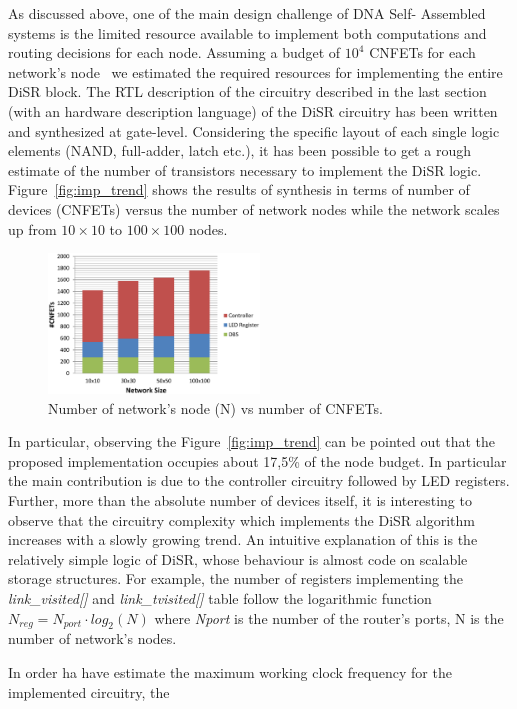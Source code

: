 As discussed above, one of the main design challenge of DNA Self-
Assembled systems is the limited resource available to implement both
computations and routing decisions for each node. Assuming a budget of
$10^4$ CNFETs for each network's node~\cite{liu_jetcs}  we estimated
the required resources for implementing the entire DiSR block. The RTL
description of the circuitry described in the last section (with an
hardware description language)  of the DiSR circuitry has been written
and synthesized at gate-level. Considering the specific layout of each
single logic elements (NAND, full-adder, latch etc.), it has been
possible to get a rough estimate of the number of transistors
necessary to implement the DiSR logic. Figure~\ref{fig:imp_trend}
shows the results of synthesis in terms of number of devices (CNFETs)
versus the number of network nodes while the network scales up from
$10\times10$ to $100\times100$ nodes.

\begin{figure}
  \centering
  \includegraphics[width=0.50\textwidth]{pictures/synthesis.eps}
  \caption{Number of network's node (N) vs number of CNFETs.}
 \label{fig:synthesys}
\end{figure}

In particular, observing the Figure~\ref{fig:imp_trend} can 
be pointed out that the proposed implementation occupies about 17,5\% of the node budget. In particular the main contribution is due to the controller circuitry followed by LED registers.
Further, more than the absolute number of devices itself, it is interesting to
observe that the circuitry
complexity which implements the DiSR algorithm increases with a slowly
growing trend.  
An intuitive explanation of this is the relatively simple logic of
DiSR, whose behaviour is almost code on scalable storage structures.
For example, the number of registers
implementing the \emph{link\_visited[]} and \emph{link\_tvisited[]}
table follow the logarithmic function $N_{reg}=N_{port} \cdot
log_2(N)$ where \emph{Nport} is the number of the router’s ports, N is
the number of network’s nodes. 

In order ha have estimate the maximum working clock frequency for the implemented
circuitry, the \cite{deng_isscc07}




